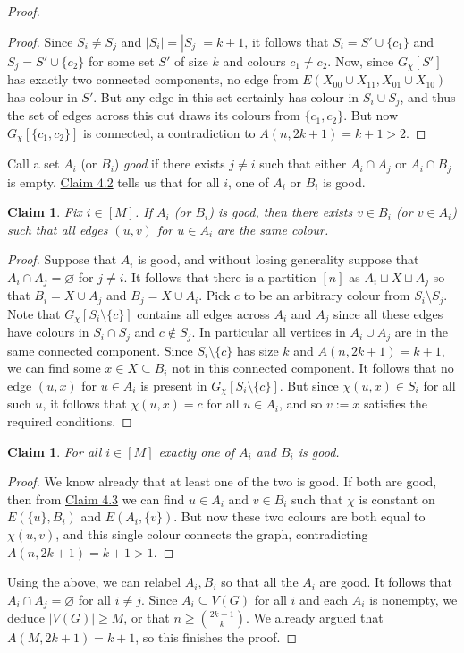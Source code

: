 \documentclass[11pt,a4paper]{article}
\newtheorem{claim}[theorem]{Claim}
\begin{document}
\begin{proof}
\begin{proof}
\noindent
Since $S_i \ne S_j$ and $|S_i| = |S_j| = k+1$, it follows that $S_i = S' \cup \{c_1\}$ and $S_j = S' \cup \{c_2\}$ for some set $S'$ of size $k$ and colours $c_1 \ne c_2$. Now, since $G_{\chi}[S']$ has exactly two connected components, no edge from $E(X_{00} \cup X_{11}, X_{01} \cup X_{10})$ has colour in $S'$. But any edge in this set certainly has colour in $S_i \cup S_j$, and thus the set of edges across this cut draws its colours from $\{c_1, c_2\}$. But now $G_{\chi}[\{c_1,c_2\}]$ is connected, a contradiction to $A(n,2k+1) = k+1 > 2$.
\end{proof}
\noindent
Call a set $A_i$ (or $B_i$) \emph{good} if there exists $j \ne i$ such that either $A_i \cap A_j$ or $A_i \cap B_j$ is empty. \hyperref[claim:4:2]{Claim 4.2} tells us that for all $i$, one of $A_i$ or $B_i$ is good.
\begin{claim}
\label{claim:4:3}
Fix $i \in [M]$. If $A_i$ (or $B_i$) is good, then there exists $v \in B_i$ (or $v \in A_i$) such that all edges $(u, v)$ for $u \in A_i$ are the same colour.
\end{claim}
\begin{proof}
Suppose that $A_i$ is good, and without losing generality suppose that $A_i \cap A_j = \varnothing$ for $j \ne i$. It follows that there is a partition $[n]$ as $A_i \sqcup X \sqcup A_j$ so that $B_i = X \cup A_j$ and $B_j = X \cup A_i$. Pick $c$ to be an arbitrary colour from $S_i \setminus S_j$. \\

\noindent
Note that $G_{\chi}[S_i \setminus \{c\}]$ contains all edges across $A_i$ and $A_j$ since all these edges have colours in $S_i \cap S_j$ and $c \not \in S_j$. In particular all vertices in $A_i \cup A_j$ are in the same connected component. Since $S_i \setminus \{c\}$ has size $k$ and $A(n,2k+1) = k+1$, we can find some $x \in X \subseteq B_i$ not in this connected component. It follows that no edge $(u, x)$ for $u \in A_i$ is present in $G_{\chi}[S_i \setminus \{c\}]$. But since $\chi(u,x) \in S_i$ for all such $u$, it follows that $\chi(u,x) = c$ for all $u \in A_i$, and so $v := x$ satisfies the required conditions.
\end{proof}
\begin{claim}
For all $i \in [M]$ \emph{exactly} one of $A_i$ and $B_i$ is good.
\end{claim}
\begin{proof}
We know already that at least one of the two is good. If both are good, then from \hyperref[claim:4:3]{Claim 4.3} we can find $u \in A_i$ and $v \in B_i$ such that $\chi$ is constant on $E(\{u\}, B_i)$ and $E(A_i, \{v\})$. But now these two colours are both equal to $\chi(u,v)$, and this single colour connects the graph, contradicting $A(n,2k+1) = k+1  > 1$.
\end{proof}
\noindent
Using the above, we can relabel $A_i, B_i$ so that all the $A_i$ are good. It follows that $A_i \cap A_j = \varnothing$ for all $i \ne j$. Since $A_i \subseteq V(G)$ for all $i$ and each $A_i$ is nonempty, we deduce $|V(G)| \geq M$, or that $n \geq \binom{2k+1}{k}$. We already argued that $A(M, 2k+1) = k+1$, so this finishes the proof.
\end{proof}
\noindent
\end{document}
